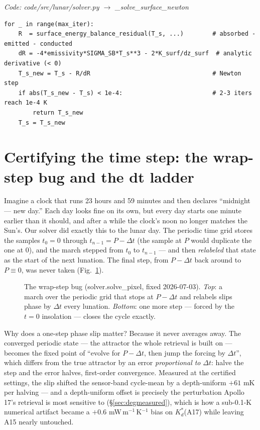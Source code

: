 \documentclass[11pt]{report}
\newcommand{\code}[1]{{\ttfamily\small #1}}
\begin{document}
{\small\color{dim}\textit{Code: \code{code/src/lunar/solver.py} $\to$ \code{\_solve\_surface\_newton}}}
\begin{lstlisting}[style=py]
for _ in range(max_iter):
    R  = surface_energy_balance_residual(T_s, ...)        # absorbed - emitted - conducted
    dR = -4*emissivity*SIGMA_SB*T_s**3 - 2*K_surf/dz_surf  # analytic derivative (< 0)
    T_s_new = T_s - R/dR                                  # Newton step
    if abs(T_s_new - T_s) < 1e-4:                         # 2-3 iters reach 1e-4 K
        return T_s_new
    T_s = T_s_new
\end{lstlisting}

\section{Certifying the time step: the wrap-step bug and the dt
ladder}\label{app:dtcert}

\begin{plain}
Imagine a clock that runs 23 hours and 59 minutes and then declares
``midnight --- new day.'' Each day looks fine on its own, but every day
starts one minute earlier than it should, and after a while the clock's
noon no longer matches the Sun's. Our solver did exactly this to the lunar
day. The periodic time grid stores the samples $t_0{=}0$ through
$t_{n-1}{=}P{-}\Delta t$ (the sample at $P$ would duplicate the one at 0),
and the march stepped from $t_0$ to $t_{n-1}$ --- and then \emph{relabeled}
that state as the start of the next lunation. The final step, from
$P{-}\Delta t$ back around to $P\equiv 0$, was never taken
(Fig.~\ref{fig:wrapstep}).
\end{plain}

\begin{figure}[htbp]\centering

\caption{The wrap-step bug (\code{solver.solve\_pixel}, fixed 2026-07-03).
\emph{Top}: a march over the periodic grid that stops at $P{-}\Delta t$ and
relabels slips phase by $\Delta t$ every lunation. \emph{Bottom}: one more
step --- forced by the $t{=}0$ insolation --- closes the cycle exactly.}
\label{fig:wrapstep}
\end{figure}

Why does a one-step phase slip matter? Because it never averages away. The
converged periodic state --- the attractor the whole retrieval is built on
--- becomes the fixed point of ``evolve for $P-\Delta t$, then jump the
forcing by $\Delta t$'', which differs from the true attractor by an error
\emph{proportional to} $\Delta t$: halve the step and the error halves,
first-order convergence. Measured at the certified settings, the slip
shifted the sensor-band cycle-mean by a depth-uniform $+61$ mK per halving
--- and a depth-uniform offset is precisely the perturbation Apollo 17's
retrieval is most sensitive to (\S\ref{sec:degmeasured}), which is how a
sub-0.1-K numerical artifact became a $+0.6$ mW\,m$^{-1}$\,K$^{-1}$ bias on
$K_d^{*}$(A17) while leaving A15 nearly untouched.
\end{document}

